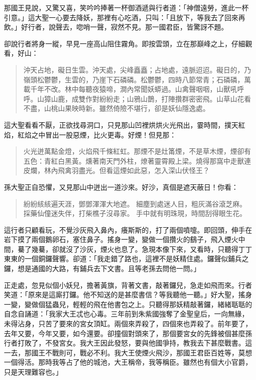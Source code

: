 那國王見說，又驚又喜，笑吟吟捧著一杯御酒遞與行者道：「神僧遠勞，進此一杯引意。」這大聖一心要去降妖，那裡有心吃酒，只叫：「且放下，等我去了回來再飲。」好行者，說聲去，唿哨一聲，寂然不見。那一國君臣，皆驚訝不題。

卻說行者將身一縱，早見一座高山阻住霧角。即按雲頭，立在那巔峰之上，仔細觀看，好山：
\begin{quote}
沖天占地，礙日生雲。沖天處，尖峰矗矗；占地處，遠脈迢迢。礙日的，乃嶺頭松鬱鬱，生雲的，乃崖下石磷磷。松鬱鬱，四時八節常青；石磷磷，萬載千年不改。林中每聽夜猿啼，澗內常聞妖蟒過。山禽聲咽咽，山獸吼呼呼。山獐山鹿，成雙作對紛紛走；山鴉山鵲，打陣攢群密密飛。山草山花看不盡，山桃山果映時新。雖然倚險不堪行，卻是妖仙隱逸處。
\end{quote}

這大聖看看不厭，正欲找尋洞口，只見那山凹裡烘烘火光飛出，霎時間，撲天紅焰，紅焰之中冒出一股惡煙，比火更毒。好煙！但見那：
\begin{quote}
火光迸萬點金燈，火焰飛千條紅虹。那煙不是灶筩煙，不是草木煙，煙卻有五色：青紅白黑黃。燻著南天門外柱，燎著靈霄殿上梁。燒得那窩中走獸連皮爛，林內飛禽羽盡光。但看這煙如此惡，怎入深山伏怪王？
\end{quote}

孫大聖正自恐懼，又見那山中迸出一道沙來。好沙，真個是遮天蔽日！你看：
\begin{quote}
紛紛絯絯遍天涯，鄧鄧渾渾大地遮。
細塵到處迷人目，粗灰滿谷滾芝麻。
採藥仙僮迷失伴，打柴樵子沒尋家。
手中就有明珠現，時間刮得眼生花。
\end{quote}

這行者只顧看玩，不覺沙灰飛入鼻內，癢斯斯的，打了兩個噴嚏。即回頭，伸手在岩下摸了兩個鵝卵石，塞住鼻子。搖身一變，變做一個攢火的鷂子，飛入煙火中間，驀了幾驀，卻就沒了沙灰，煙火也息了。急現本像下來，又看時，只聽得丁丁東東的一個銅鑼聲響。卻道：「我走錯了路也，這裡不是妖精住處。鑼聲似鋪兵之鑼，想是通國的大路，有鋪兵去下文書。且等老孫去問他一問。」

正走處，忽見似個小妖兒，擔著黃旗，背著文書，敲著鑼兒，急走如飛而來。行者笑道：「原來是這廝打鑼。他不知送的是甚麼書信？等我聽他一聽。」好大聖，搖身一變，變做個猛蟲兒，輕輕的飛在他書包之上。只聽得那妖精敲著鑼，緒緒聒聒的自念自誦道：「我家大王忒也心毒。三年前到朱紫國強奪了金聖皇后，一向無緣，未得沾身，只苦了要來的宮女頂缸。兩個來弄殺了，四個來也弄殺了。前年要了，去年又要，今年又要，如今還要。卻撞個對頭來了，那個要宮女的先鋒被個甚麼孫行者打敗了，不發宮女。我大王因此發怒，要與他國爭持，教我去下甚麼戰書。這一去，那國王不戰則可，戰必不利。我大王使煙火飛沙，那國王君臣百姓等，莫想一個得活。那時我等占了他的城池，大王稱帝，我等稱臣。雖然也有個大小官爵，只是天理難容也。」

